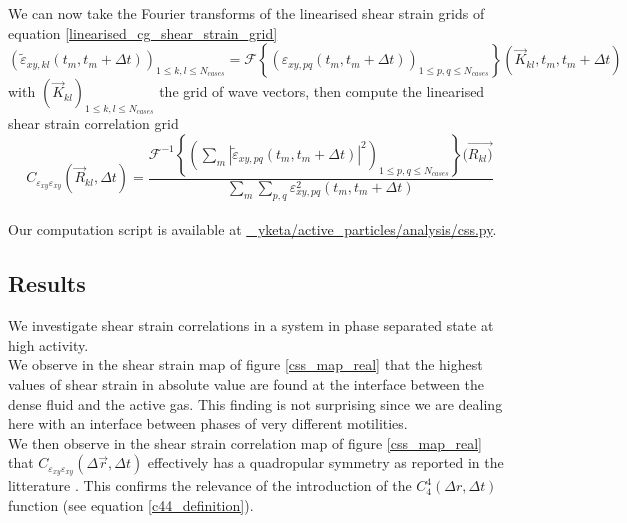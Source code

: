 \documentclass[class=report, float=false, crop=false]{standalone}
\begin{document}
We can now take the Fourier transforms of the linearised shear strain grids of equation \ref{linearised_cg_shear_strain_grid}
\begin{equation}
(\tilde{\varepsilon}_{xy,kl}(t_m, t_m + \Delta t))_{1 \leq k, l \leq N_{cases}} = \mathcal{F}\left\{(\varepsilon_{xy,pq}(t_m, t_m + \Delta t))_{1 \leq p, q \leq N_{cases}}\right\}(\vec{K}_{kl}, t_m, t_m + \Delta t)
\end{equation}
with $(\vec{K}_{kl})_{1 \leq k, l \leq N_{cases}}$ the grid of wave vectors, then compute the linearised shear strain correlation grid
\begin{equation}
C_{\varepsilon_{xy}\varepsilon_{xy}}(\vec{R}_{kl}, \Delta t) = \frac{\mathcal{F}^{-1}\left\{\left(\sum_m |\tilde{\varepsilon}_{xy,pq}(t_m, t_m + \Delta t)|^2\right)_{1 \leq p, q \leq N_{cases}}\right\}(\vec{R_{kl})}}{\sum_m\sum_{p, q} \varepsilon_{xy, pq}^2(t_m, t_m + \Delta t)}
\end{equation}
\mbox{}\\

Our computation script is available at \href{https://github.com/yketa/active_particles/blob/master/analysis/css.py}{{\faGithub~ yketa/active\_particles/analysis/css.py}}.

\subsection{Results}
\label{subsection:real_method_results}


We investigate shear strain correlations in a system in phase separated state at high activity.\\

We observe in the shear strain map of figure \ref{css_map_real} that the highest values of shear strain in absolute value are found at the interface between the dense fluid and the active gas. This finding is not surprising since we are dealing here with an interface between phases of very different motilities.\\

We then observe in the shear strain correlation map of figure \ref{css_map_real} that $C_{\varepsilon_{xy}\varepsilon_{xy}}(\Delta \vec{r}, \Delta t)$ effectively has a quadropular symmetry as reported in the litterature \cite{illing2016strain, hassani2018long}. This confirms the relevance of the introduction of the $C_4^4(\Delta r, \Delta t)$ function (see equation \ref{c44_definition}).\\
\end{document}
